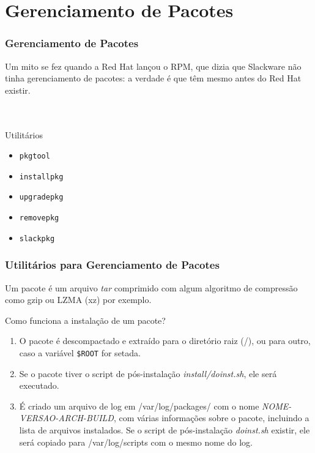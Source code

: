 \documentclass{beamer}
\begin{document}
\section{Gerenciamento de Pacotes}
\begin{frame}
	\frametitle{Gerenciamento de Pacotes}
	Um mito se fez quando a Red Hat lançou o RPM, que dizia que Slackware
	não tinha gerenciamento de pacotes: a verdade é que têm mesmo antes
	do Red Hat existir.
	~\\
	~\\
	~\\
	\begin{block}{Utilitários}
		\begin{itemize}
			\item \texttt{pkgtool}
			\item \texttt{installpkg}
			\item \texttt{upgradepkg}
			\item \texttt{removepkg}
			\item \texttt{slackpkg}
		\end{itemize}
	\end{block}
\end{frame}

\begin{frame}
	\frametitle{Utilitários para Gerenciamento de Pacotes}
	Um pacote é um arquivo \textit{tar} comprimido com algum algoritmo de compressão
	como gzip ou LZMA (xz) por exemplo.\\

	\begin{block}{Como funciona a instalação de um pacote?}
	\begin{enumerate}
		\item O pacote é descompactado e extraído para o diretório raiz (/),
			ou para outro, caso a variável \texttt{\$ROOT} for
			setada.
		\item Se o pacote tiver o script de pós-instalação \textit{install/doinst.sh},
			ele será executado.
		\item É criado um arquivo de log em /var/log/packages/ com o nome 
			\small{\textit{NOME-VERSAO-ARCH-BUILD}}, com várias informações sobre o
			pacote, incluindo a lista de arquivos instalados. Se o script
			de pós-instalação \textit{doinst.sh} existir, ele será copiado
			para /var/log/scripts com o mesmo nome do log.
	\end{enumerate}
	\end{block}
\end{frame}
\end{document}
